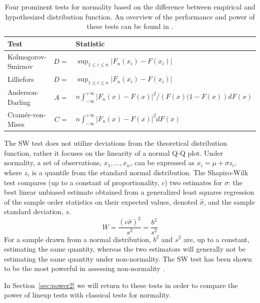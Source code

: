 \documentclass[12pt]{article}\usepackage[]{graphicx}\usepackage[]{color}
\begin{document}
\begin{table}
\centering
\caption{\label{tab:tests} Four prominent tests for normality based on the difference between empirical and hypothesized distribution function. An overview of the performance and power of these tests can be found in \citet{stephens:1974}.}
\begin{tabular}{lrl}\hline
Test && Statistic\\\hline\hline
Kolmogorov-Smirnov & $D =$ & $ \sup_{1 \le i \le n} \left | F_n(x_i) - F(x_i)\right|$ \\
Lilliefors & $D =$ & $ \sup_{1 \le i \le n} \left | F_n(x_i) - F(x_i)\right|$ \\
Anderson-Darling & $A =$ & $ n \int_{-\infty}^{+\infty} \left | F_n(x) - F(x)\right|^2/\left(F(x)(1 - F(x)\right) dF(x)$\\
Cram\'{e}r-von-Mises & $C =$ & $n \int_{-\infty}^{+\infty} \left | F_n(x) - F(x)\right|^2 dF(x)$ \\\hline
\end{tabular}
\end{table}
\afterpage{\clearpage}

%

The SW test \cite[SW-test,][]{Shapiro:1965kt} does not utilize deviations from the theoretical distribution function, rather it focuses on the linearity of a normal Q-Q plot. Under normality, a set of observations, $x_1, \ldots, x_n$, can be expressed as $x_i = \mu + \sigma z_i$, where $z_i$ is a quantile from the standard normal distribution. The Shapiro-Wilk test compares (up to a constant of proportionality, $c$) two estimates for $\sigma$: the best linear unbiased estimate obtained from a generalized least squares regression of the sample order statistics on their expected values, denoted $\widehat{\sigma}$, and the sample standard deviation, $s$.
\[
  W = \frac{(c \widehat{\sigma})^2}{s^2} = \frac{b^2}{s^2}
\]
For a sample drawn from a normal distribution, $b^2$ and $s^2$ are, up to a constant, estimating the same quantity, whereas the two estimators will generally not be estimating the same quantity under non-normality. The SW test has been shown to be the most powerful in assessing non-normality \citep{stephens:1974, razali:2011}.

In Section~\ref{sec:power2} we will return to these tests in order to compare the power of lineup tests with classical tests for normality.
\end{document}
